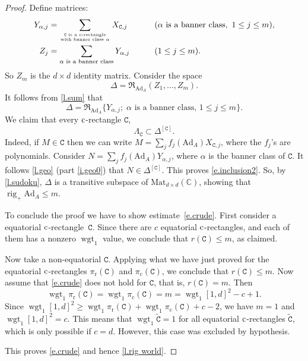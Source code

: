 \documentclass[10pt, a4paper]{amsart}
\theoremstyle{plain}
\theoremstyle{definition}
\theoremstyle{remark}
\theoremstyle{note}
\numberwithin{equation}{section}
\begin{document}
\begin{proof}
Define matrices:
\begin{alignat*}{2}
Y_{\alpha, j} &= 
\sum_{\text{${\mathtt{C}}$ is a $\rm c$-rectangle}\atop\text{with banner class $\alpha$}} X_{{\mathtt{C}}, j}
&\qquad &(\alpha \text{ is a banner class}, \ 1 \le j \le m), \\
Z_j &= \sum_{\alpha \text{ is a banner class}} Y_{\alpha, j} 
&\qquad &(1 \le j \le m).
\end{alignat*}
So $Z_m$ is the $d \times d$ identity matrix.
Consider the space 
$$
\Delta = {\mathfrak{R}}_{{\mathrm{Ad}}_A} (Z_1, \dots, Z_m).
$$
It follows from \cref{l.sum} that 
$$
\Delta = {\mathfrak{R}}_{{\mathrm{Ad}}_A} \big\{ Y_{\alpha,j} ; \; \alpha \text{ is a banner class, } 1 \le j \le m \big\}.
$$
We claim that every $\rm c$-rectangle ${\mathtt{C}}$, 
\begin{equation}\label{e.inclusion2}
\Lambda_{\mathtt{C}} \subset \Delta^{[{\mathtt{C}}]}.
\end{equation}
Indeed, if $M \in {\mathtt{C}}$ then we can write $M = \sum_j f_j({\mathrm{Ad}}_A) X_{{\mathtt{C}},j}$,
where the $f_j$'s are polynomials.
Consider $N = \sum_j f_j({\mathrm{Ad}}_A) Y_{\alpha,j}$, where $\alpha$ is the banner class of ${\mathtt{C}}$.
It follows \cref{l.geo} (part \ref{i.geo0}) that $N \in \Delta^{[{\mathtt{C}}]}$.
This proves \eqref{e.inclusion2}.
So, by \cref{l.sudoku}, $\Delta$ is a transitive subspace of ${\mathrm{Mat}}_{d \times d}({\mathbb{C}})$, 
showing that $\operatorname{rig}_+ {\mathrm{Ad}}_A \le m$.

\medskip

To conclude the proof we have to show estimate~\eqref{e.crude}.
First consider a equatorial $\rm c$-rectangle~${\mathtt{C}}$.
Since there are $c$
equatorial $\rm c$-rectangles, and each of them has a nonzero $\operatorname{wgt}_1$ value,
we conclude that $r({\mathtt{C}}) \le m$, as claimed.

Now take a non-equatorial ${\mathtt{C}}$.
Applying what we have just proved for the equatorial $\rm c$-rectangles ${\pi_\mathrm{r}}({\mathtt{C}})$ and ${\pi_\mathrm{c}}({\mathtt{C}})$,
we conclude that $r({\mathtt{C}}) \le m$.
Now assume that \eqref{e.crude} does not hold for ${\mathtt{C}}$, that is, $r({\mathtt{C}}) = m$.
Then 
$$
\operatorname{wgt}_1 {\pi_\mathrm{r}}({\mathtt{C}}) = \operatorname{wgt}_1 {\pi_\mathrm{c}} ({\mathtt{C}}) = m = \operatorname{wgt}_1 [1,d]^2 - c + 1.
$$
Since $\operatorname{wgt}_1 [1,d]^2 \ge \operatorname{wgt}_1 {\pi_\mathrm{r}}({\mathtt{C}}) + \operatorname{wgt}_1 {\pi_\mathrm{c}} ({\mathtt{C}}) + c - 2$,
we have $m=1$ and $\operatorname{wgt}_1 [1,d]^2 = c$.
This means that $\operatorname{wgt}_1 \tilde {\mathtt{C}} = 1$ for all equatorial $\rm c$-rectangles $\tilde {\mathtt{C}}$,
which is only possible if $c=d$.
However, this case was excluded by hypothesis.

This proves \eqref{e.crude} and hence \cref{l.rig world}.
\end{proof}
\end{document}
